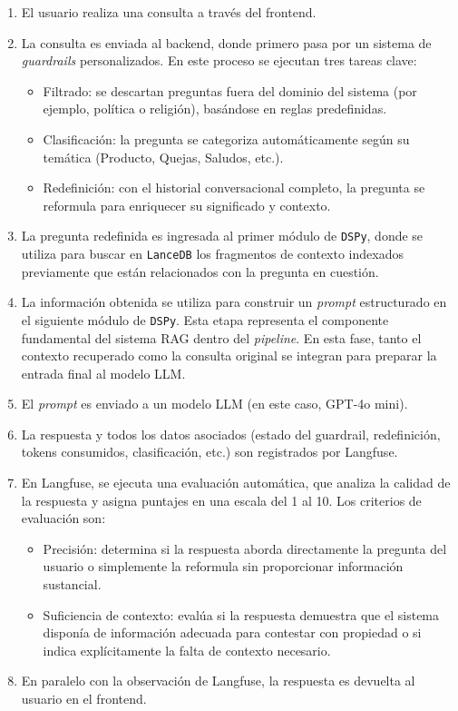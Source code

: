 \begin{enumerate}
    \item El usuario realiza una consulta a través del frontend.
    
    \item La consulta es enviada al backend, donde primero pasa por un sistema de \textit{guardrails} personalizados. En este proceso se ejecutan tres tareas clave:
    \begin{itemize}
        \item Filtrado: se descartan preguntas fuera del dominio del sistema (por ejemplo, política o religión), basándose en reglas predefinidas.
        \item Clasificación: la pregunta se categoriza automáticamente según su temática (Producto, Quejas, Saludos, etc.).
        \item Redefinición: con el historial conversacional completo, la pregunta se reformula para enriquecer su significado y contexto.
    \end{itemize}
    
    \item La pregunta redefinida es ingresada al primer módulo de \texttt{DSPy}, donde se utiliza para buscar en \texttt{LanceDB} los fragmentos de contexto indexados previamente que están relacionados con la pregunta en cuestión.
    
    \item La información obtenida se utiliza para construir un \textit{prompt} estructurado en el siguiente módulo de \texttt{DSPy}. Esta etapa representa el componente fundamental del sistema RAG dentro del \textit{pipeline}. En esta fase, tanto el contexto recuperado como la consulta original se integran para preparar la entrada final al modelo LLM.
    
    \item El \textit{prompt} es enviado a un modelo LLM (en este caso, GPT-4o mini).
    
    \item La respuesta y todos los datos asociados (estado del guardrail, redefinición, tokens consumidos, clasificación, etc.) son registrados por Langfuse.
    
    \item En Langfuse, se ejecuta una evaluación automática, que analiza la calidad de la respuesta y asigna puntajes en una escala del 1 al 10. Los criterios de evaluación son:
        \begin{itemize}
            \item Precisión: determina si la respuesta aborda directamente la pregunta del usuario o simplemente la reformula sin proporcionar información sustancial.
            \item Suficiencia de contexto: evalúa si la respuesta demuestra que el sistema disponía de información adecuada para contestar con propiedad o si indica explícitamente la falta de contexto necesario.
        \end{itemize}
        
    \item En paralelo con la observación de Langfuse, la respuesta es devuelta al usuario en el frontend.
\end{enumerate}

